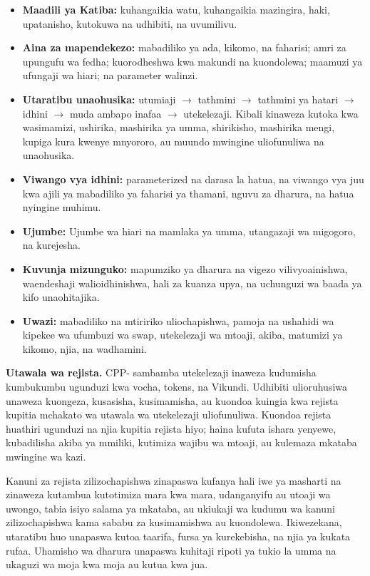 \documentclass[11pt]{article}
\begin{document}
\begin{itemize}[leftmargin=*]
\item \textbf{Maadili ya Katiba:} kuhangaikia watu, kuhangaikia mazingira, haki, upatanisho, kutokuwa na udhibiti, na uvumilivu.
\item \textbf{Aina za mapendekezo:} mabadiliko ya ada, kikomo, na faharisi; amri za upungufu wa fedha; kuorodheshwa kwa makundi na kuondolewa; maamuzi ya ufungaji wa hiari; na parameter walinzi.
\item \textbf{Utaratibu unaohusika:} utumiaji $\to$ tathmini $\to$ tathmini ya hatari $\to$ idhini $\to$ muda ambapo inafaa $\to$ utekelezaji. Kibali kinaweza kutoka kwa wasimamizi, ushirika, mashirika ya umma, shirikisho, mashirika mengi, kupiga kura kwenye mnyororo, au muundo mwingine uliofunuliwa na unaohusika.
\item \textbf{Viwango vya idhini:} parameterized na darasa la hatua, na viwango vya juu kwa ajili ya mabadiliko ya faharisi ya thamani, nguvu za dharura, na hatua nyingine muhimu.
\item \textbf{Ujumbe:} Ujumbe wa hiari na mamlaka ya umma, utangazaji wa migogoro, na kurejesha.
\item \textbf{Kuvunja mizunguko:} mapumziko ya dharura na vigezo vilivyoainishwa, waendeshaji walioidhinishwa, hali za kuanza upya, na uchunguzi wa baada ya kifo unaohitajika.
\item \textbf{Uwazi:} mabadiliko na mtiririko uliochapishwa, pamoja na ushahidi wa kipekee wa ufumbuzi wa swap, utekelezaji wa mtoaji, akiba, matumizi ya kikomo, njia, na wadhamini.
\end{itemize}
\textbf{Utawala wa rejista.} CPP- sambamba utekelezaji inaweza kudumisha kumbukumbu ugunduzi kwa vocha, tokens, na Vikundi. Udhibiti ulioruhusiwa unaweza kuongeza, kusasisha, kusimamisha, au kuondoa kuingia kwa rejista kupitia mchakato wa utawala wa utekelezaji uliofunuliwa. Kuondoa rejista huathiri ugunduzi na njia kupitia rejista hiyo; haina kufuta ishara yenyewe, kubadilisha akiba ya mmiliki, kutimiza wajibu wa mtoaji, au kulemaza mkataba mwingine wa kazi.

Kanuni za rejista zilizochapishwa zinapaswa kufanya hali iwe ya masharti na zinaweza kutambua kutotimiza mara kwa mara, udanganyifu au utoaji wa uwongo, tabia isiyo salama ya mkataba, au ukiukaji wa kudumu wa kanuni zilizochapishwa kama sababu za kusimamishwa au kuondolewa. Ikiwezekana, utaratibu huo unapaswa kutoa taarifa, fursa ya kurekebisha, na njia ya kukata rufaa. Uhamisho wa dharura unapaswa kuhitaji ripoti ya tukio la umma na ukaguzi wa moja kwa moja au kutua kwa jua.
\end{document}
